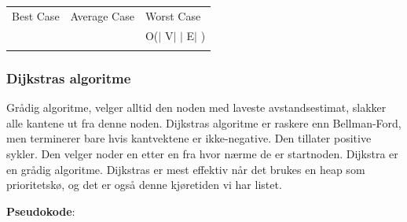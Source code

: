 \documentclass[12pt]{report}
\begin{document}
\vspace{\baselineskip}




\begin{table}[H]
 			\centering
\begin{tabular}{p{1.75in}p{2.41in}p{1.91in}}
\hline
\multicolumn{1}{p{1.75in}}{{\fontsize{13pt}{15.6pt}\selectfont Best Case}} & 
\multicolumn{1}{p{2.41in}}{{\fontsize{13pt}{15.6pt}\selectfont Average Case}} & 
\multicolumn{1}{p{1.91in}}{{\fontsize{13pt}{15.6pt}\selectfont Worst Case}} \\
\hhline{---}
\multicolumn{1}{p{1.75in}}{} & 
\multicolumn{1}{p{2.41in}}{} & 
\multicolumn{1}{p{1.91in}}{{\fontsize{14pt}{16.8pt}\selectfont O($ \vert $ V$ \vert $ $ \vert $ E$ \vert $ )}} \\
\hhline{---}

\end{tabular}
 \end{table}




\vspace{\baselineskip}
\setlength{\parskip}{6.0pt}

\vspace{\baselineskip}\subsubsection*{Dijkstras algoritme}
\setlength{\parskip}{10.56pt}
Grådig algoritme, velger alltid den noden med laveste avstandsestimat, slakker alle kantene ut fra denne noden. Dijkstras algoritme er raskere enn Bellman-Ford, men terminerer bare hvis kantvektene er ikke-negative. Den tillater positive sykler. Den velger noder en etter en fra hvor nærme de er startnoden. Dijkstra er en grådig algoritme. Dijkstras er mest effektiv når det brukes en heap som prioritetskø, og det er også denne kjøretiden vi har listet. \par

{\fontsize{13pt}{15.6pt}\selectfont \textbf{Pseudokode}:\par}\par


\vspace{\baselineskip}


\end{document}
